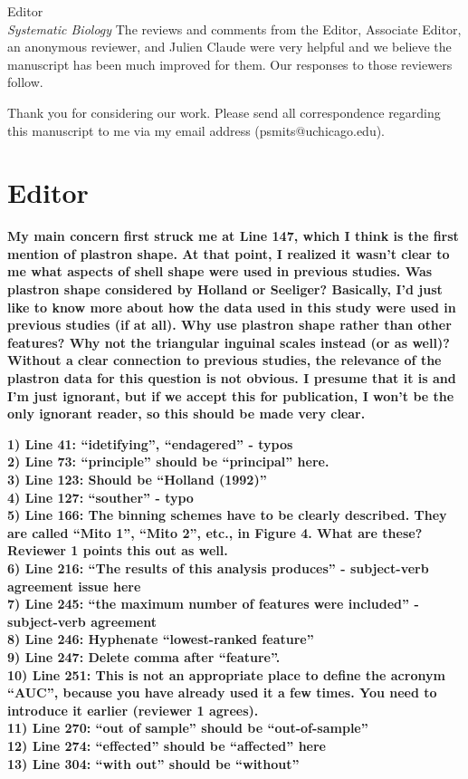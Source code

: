 \documentclass{letter}
\begin{document}
\begin{letter}{Editor \\ \textit{Systematic Biology}}
  The reviews and comments from the Editor, Associate Editor, an anonymous reviewer, and Julien Claude were very helpful and we believe the manuscript has been much improved for them. Our responses to those reviewers follow.

  Thank you for considering our work. Please send all correspondence regarding this manuscript to me via my email address (psmits@uchicago.edu).



  \section{Editor}
  \textbf{My main concern first struck me at Line 147, which I think is the first mention of plastron shape. At that point, I realized it wasn’t clear to me what aspects of shell shape were used in previous studies. Was plastron shape considered by Holland or Seeliger? Basically, I’d just like to know more about how the data used in this study were used in previous studies (if at all). Why use plastron shape rather than other features? Why not the triangular inguinal scales instead (or as well)? Without a clear connection to previous studies, the relevance of the plastron data for this question is not obvious. I presume that it is and I’m just ignorant, but if we accept this for publication, I won’t be the only ignorant reader, so this should be made very clear.}


  \textbf{1) Line 41: ``idetifying'', ``endagered'' - typos \\
    2) Line 73: “principle” should be ``principal'' here. \\
    3) Line 123: Should be ``Holland (1992)'' \\
    4) Line 127: ``souther'' - typo \\
    5) Line 166: The binning schemes have to be clearly described. They are called ``Mito 1'', ``Mito 2'', etc., in Figure 4. What are these? Reviewer 1 points this out as well. \\
    6) Line 216: ``The results of this analysis produces'' - subject-verb agreement issue here \\
    7) Line 245: ``the maximum number of features were included'' - subject-verb agreement \\
    8) Line 246: Hyphenate ``lowest-ranked feature''\\
    9) Line 247: Delete comma after ``feature''. \\
    10) Line 251: This is not an appropriate place to define the acronym ``AUC'', because you have already used it a few times. You need to introduce it earlier (reviewer 1 agrees).\\
    11) Line 270: ``out of sample'' should be ``out-of-sample''\\
    12) Line 274: ``effected'' should be ``affected'' here \\
  13) Line 304: ``with out'' should be ``without'' }


\end{letter}
\end{document}
